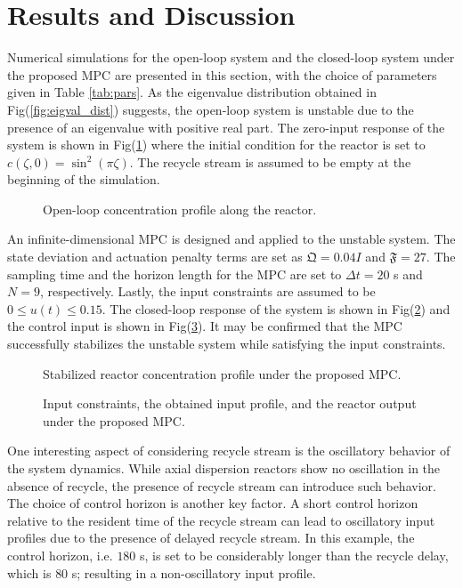 \section{Results and Discussion}

Numerical simulations for the open-loop system and the closed-loop system under the proposed MPC are presented in this section, with the choice of parameters given in Table \ref{tab:pars}. As the eigenvalue distribution obtained in Fig(\ref{fig:eigval_dist}) suggests, the open-loop system is unstable due to the presence of an eigenvalue with positive real part. The zero-input response of the system is shown in Fig(\ref{fig:openloop_response}) where the initial condition for the reactor is set to $c(\zeta,0) = \sin^2(\pi \zeta)$. The recycle stream is assumed to be empty at the beginning of the simulation.

\begin{figure}[!htbp]
    \centering
    
    \caption{Open-loop concentration profile along the reactor.}
    \label{fig:openloop_response}
\end{figure}

An infinite-dimensional MPC is designed and applied to the unstable system. The state deviation and actuation penalty terms are set as $\mathfrak{Q} = 0.04 I$ and $\mathfrak{F} = 27$. The sampling time and the horizon length for the MPC are set to $\Delta t = 20$ s and $N = 9$, respectively. Lastly, the input constraints are assumed to be $0 \leq u(t) \leq 0.15$. The closed-loop response of the system is shown in Fig(\ref{fig:closedloop_response}) and the control input is shown in Fig(\ref{fig:control_input}). It may be confirmed that the MPC successfully stabilizes the unstable system while satisfying the input constraints.

\begin{figure}[!htbp]
    \centering
    
    \caption{Stabilized reactor concentration profile under the proposed MPC.}
    \label{fig:closedloop_response}
\end{figure}

\begin{figure}[!htbp]
    \centering
    
    \caption{Input constraints, the obtained input profile, and the reactor output under the proposed MPC.}
    \label{fig:control_input}
\end{figure}

One interesting aspect of considering recycle stream is the oscillatory behavior of the system dynamics. While axial dispersion reactors show no oscillation in the absence of recycle, the presence of recycle stream can introduce such behavior. The choice of control horizon is another key factor. A short control horizon relative to the resident time of the recycle stream can lead to oscillatory input profiles due to the presence of delayed recycle stream. In this example, the control horizon, i.e. $180$ s, is set to be considerably longer than the recycle delay, which is $80$ s; resulting in a non-oscillatory input profile.